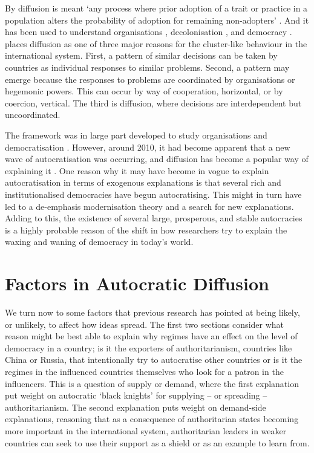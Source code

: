 By diffusion is meant `any process where prior adoption of a trait or practice in a population alters the probability of adoption for remaining non-adopters' \citep[p. 325]{strang_adding_1991}. And it has been used to understand organisations \citep{dimaggio_iron_1983}, decolonisation \citep{strang_adding_1991}, and democracy \citep{elkins_waves_2005}. \citet{elkins_waves_2005} places diffusion as one of three major reasons for the cluster-like behaviour in the international system. First, a pattern of similar decisions can be taken by countries as individual responses to similar problems. Second, a pattern may emerge because the responses to problems are coordinated by organisations or hegemonic powers. This can occur by way of cooperation, horizontal, or by coercion, vertical. The third is diffusion, where decisions are interdependent but uncoordinated. 

The framework was in large part developed to study organisations and democratisation \citep{elkins_waves_2005, huntington_third_1991}. However, around 2010, it had become apparent that a new wave of autocratisation was occurring, and diffusion has become a popular way of explaining it \citep{ambrosio_constructing_2010, gelman_authoritarian_2008, lankina_authoritarian_2016, weyland_autocratic_2017}. One reason why it may have become in vogue to explain autocratisation in terms of exogenous explanations is that several rich and institutionalised democracies have begun autocratising. This might in turn have led to a de-emphasis modernisation theory and a search for new explanations. Adding to this, the existence of several large, prosperous, and stable autocracies is a highly probable reason of the shift in how researchers try to explain the waxing and waning of democracy in today's world. 

\section{Factors in Autocratic Diffusion}
We turn now to some factors that previous research has pointed at being likely, or unlikely, to affect how ideas spread. The first two sections consider what reason might be best able to explain why regimes have an effect on the level of democracy in a country; is it the exporters of authoritarianism, countries like China or Russia, that intentionally try to autocratise other countries or is it the regimes in the influenced countries themselves who look for a patron in the influencers. This is a question of supply or demand, where the first explanation put weight on autocratic `black knights' for supplying -- or spreading -- authoritarianism. The second explanation puts weight on demand-side explanations, reasoning that as a consequence of authoritarian states becoming more important in the international system, authoritarian leaders in weaker countries can seek to use their support as a shield or as an example to learn from. 

